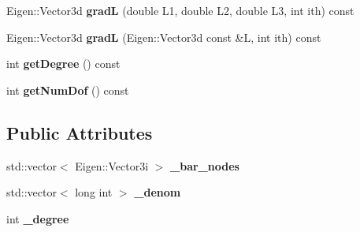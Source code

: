 \begin{DoxyCompactItemize}
\item 
\hypertarget{class_shape_function_3_01_simplex_3_013_01_4_01_4_adc7073096ed40e82e961a07390c5a25e}{
Eigen::Vector3d {\bfseries gradL} (double L1, double L2, double L3, int ith) const }
\label{class_shape_function_3_01_simplex_3_013_01_4_01_4_adc7073096ed40e82e961a07390c5a25e}

\item 
\hypertarget{class_shape_function_3_01_simplex_3_013_01_4_01_4_aa54633d3624d185193d5aade8afd4656}{
Eigen::Vector3d {\bfseries gradL} (Eigen::Vector3d const \&L, int ith) const }
\label{class_shape_function_3_01_simplex_3_013_01_4_01_4_aa54633d3624d185193d5aade8afd4656}

\item 
\hypertarget{class_shape_function_3_01_simplex_3_013_01_4_01_4_ae9164e8ade4e0e0229629ae37cfd94b8}{
int {\bfseries getDegree} () const }
\label{class_shape_function_3_01_simplex_3_013_01_4_01_4_ae9164e8ade4e0e0229629ae37cfd94b8}

\item 
\hypertarget{class_shape_function_3_01_simplex_3_013_01_4_01_4_a2e3a21f5a8421bf4f0b8349fd4f0b9b0}{
int {\bfseries getNumDof} () const }
\label{class_shape_function_3_01_simplex_3_013_01_4_01_4_a2e3a21f5a8421bf4f0b8349fd4f0b9b0}

\end{DoxyCompactItemize}
\subsection*{Public Attributes}
\begin{DoxyCompactItemize}
\item 
\hypertarget{class_shape_function_3_01_simplex_3_013_01_4_01_4_ada1e0b3af8fc6cfb2a71070fc614baf4}{
std::vector$<$ Eigen::Vector3i $>$ {\bfseries \_\-bar\_\-nodes}}
\label{class_shape_function_3_01_simplex_3_013_01_4_01_4_ada1e0b3af8fc6cfb2a71070fc614baf4}

\item 
\hypertarget{class_shape_function_3_01_simplex_3_013_01_4_01_4_ad37bfa8793b2acf1ea518a7cfc19458c}{
std::vector$<$ long int $>$ {\bfseries \_\-denom}}
\label{class_shape_function_3_01_simplex_3_013_01_4_01_4_ad37bfa8793b2acf1ea518a7cfc19458c}

\item 
\hypertarget{class_shape_function_3_01_simplex_3_013_01_4_01_4_ae7a952a6f189f7fa8180668e6476430f}{
int {\bfseries \_\-degree}}
\label{class_shape_function_3_01_simplex_3_013_01_4_01_4_ae7a952a6f189f7fa8180668e6476430f}

\end{DoxyCompactItemize}
